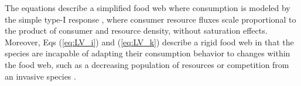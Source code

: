 The equations describe a simplified food web where consumption is modeled by the simple type-I response \cite{holling1959components}, where consumer resource fluxes scale proportional to the product of consumer and resource density, without saturation effects.
Moreover, Eqs (\ref{eq:LV_i}) and (\ref{eq:LV_k}) describe a rigid food web in that the species are incapable of adapting their consumption behavior to changes within the food web, such as a decreasing population of resources or competition from an invasive species \cite{beals1999predator}. 




